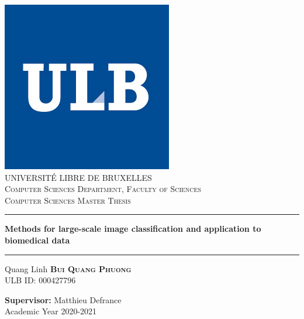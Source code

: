 \documentclass[11pt, openany]{report}
\theoremstyle{plain}
\theoremstyle{definition}
\theoremstyle{remark}
\begin{document}
\begin{titlepage}
  \begin{sffamily}
  \begin{center}

    \includegraphics[scale=0.4]{figures/logo_ulb.jpg}~\\[1cm]
    
	\textsc{\LARGE UNIVERSITÉ LIBRE DE BRUXELLES}\\[0.5cm]
    \textsc{\LARGE Computer Sciences Department, Faculty of Sciences}\\[2cm]
    \textsc{\LARGE Computer Sciences Master Thesis}\\[2cm]

    \hrule width 15cm
    \vspace{0.5cm}
    { \huge \bfseries Methods for large-scale image classification and application to biomedical data}
    \vspace{0.5cm}
	\hrule width 15cm
	\vspace{1cm}
	
	
	\LARGE Quang Linh \textsc{\textbf{\LARGE Bui Quang Phuong}} \\ [0.5cm]
	\large ULB ID: 000427796 
	
    \vfill

    {\large \textbf{Supervisor:} Matthieu Defrance} \\
    \vspace{0.5cm}
    Academic Year 2020-2021

  \end{center}
  \end{sffamily}
\end{titlepage}
\end{document}
